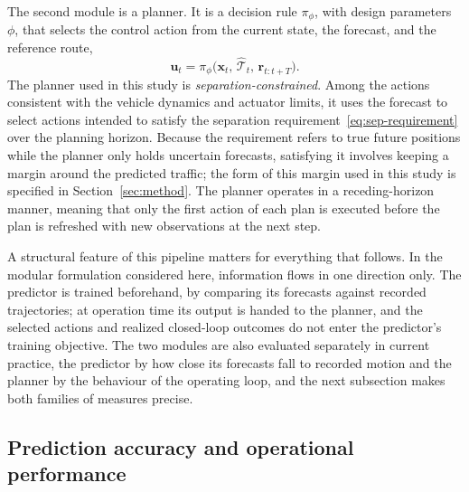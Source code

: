 \documentclass[11pt]{article}
\theoremstyle{plain}
\theoremstyle{definition}
\newcommand{\bx}{\bm{x}}
\newcommand{\bu}{\bm{u}}
\begin{document}
The second module is a planner. It is a decision rule $\pi_{\phi}$, with
design parameters $\phi$, that selects the control action from the
current state, the forecast, and the reference route,
\begin{equation}
	\label{eq:planner}
	\bu_t = \pi_{\phi}\big( \bx_t,\,
	\widehat{\mathcal{T}}_t,\,
	\bm{r}_{t:t+T} \big).
\end{equation}
The planner used in this study is \emph{separation-constrained}. Among
the actions consistent with the vehicle dynamics and actuator limits, it
uses the forecast to select actions intended to satisfy the separation
requirement~\eqref{eq:sep-requirement} over the planning horizon. Because
the requirement refers to true future positions while the planner only
holds uncertain forecasts, satisfying it involves keeping a margin around
the predicted traffic; the form of this margin used in this study is
specified in Section~\ref{sec:method}. The planner operates
in a receding-horizon manner, meaning that only the first action of each
plan is executed before the plan is refreshed with new observations at
the next step.
 
A structural feature of this pipeline matters for everything that
follows. In the modular formulation considered here, information flows
in one direction only. The predictor is trained beforehand, by comparing
its forecasts against recorded trajectories; at operation time its
output is handed to the planner, and the selected actions and realized
closed-loop outcomes do not enter the predictor's training objective.
The two
modules are also evaluated separately in current practice, the predictor
by how close its forecasts fall to recorded motion and the planner by the
behaviour of the operating loop, and the next subsection makes both
families of measures precise.
 
\subsection{Prediction accuracy and operational performance}
\label{sec:problem-objectives}
 
\end{document}
